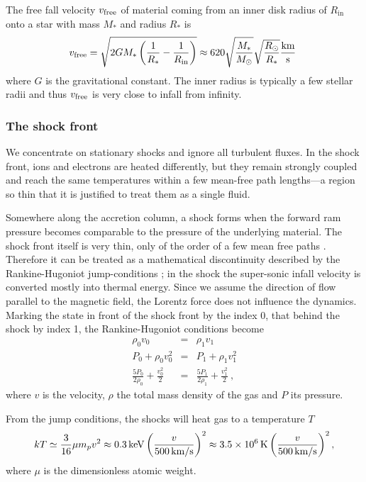 The free fall velocity $v_{\textnormal{free}}$ of material coming from an inner disk radius of $R_\mathrm{in}$ onto a star with mass $M_*$ and radius $R_*$ is
\begin{equation}
v_{\textnormal{free}} = \sqrt{{2GM_*} \left(\frac{1}{R_*} - \frac{1}{R_\mathrm{in}}\right)} \approx 620 \sqrt{\frac{M_*}{M_\odot}}\sqrt{\frac{R_\odot}{R_*}} \frac{\textnormal{km}}{\textnormal{s}}\ \label{eqn:freefall}
\end{equation}
where $G$ is the gravitational constant. The inner radius is typically a few stellar radii and thus $v_\textnormal{free}$ is very close to infall from infinity.


\subsubsection{The shock front}
We concentrate on stationary shocks and ignore all turbulent fluxes. In the shock front, ions and electrons are heated differently, but they remain strongly coupled and reach the same temperatures within a few mean-free path lengths---a region so thin that it is justified to treat them as a single fluid.

Somewhere along the accretion column, a shock forms when the forward ram pressure becomes comparable to the pressure of the underlying material. The shock front itself is very thin, only of the order of a few mean free paths \cite{raizerzeldovich}. Therefore it can be treated as a mathematical discontinuity described by the Rankine-Hugoniot jump-conditions \cite[][chap.~7, \S~15]{raizerzeldovich}; in the shock the super-sonic infall velocity is converted mostly into thermal energy. Since we assume the direction of flow parallel to the magnetic field, the Lorentz force does not influence the dynamics. Marking the state in front of the shock front by the index 0, that behind the shock by index 1, the Rankine-Hugoniot conditions become
\begin{eqnarray}
\rho_0 v_0 &=& \rho_1 v_1 \label{RH1}\\
P_0+\rho_0 v_0^2 &=& P_1+\rho_1 v_1^2 \label{RH2}\\
\frac{5 P_0}{2\rho_0}+\frac{v_0^2}{2}&=&\frac{5 P_1}{2\rho_1}+\frac{v_1^2}{2} \ ,\label{RH3}
\end{eqnarray}
where $v$ is the velocity, $\rho$ the total mass density of the gas and $P$ its pressure.

From the jump conditions, the shocks will heat gas to a temperature $T$
\begin{equation}
kT \simeq \frac{3}{16}\mu m_p v^{2} \approx 0.3\,{\rm keV}\left(\frac{v}{500\,{\rm km/s}}\right)^{2} \approx3.5\times10^6\,{\rm K} \left(\frac{v}{500\,{\rm km/s}}\right)^{2},
\label{eqn:Tshock}
\end{equation}
where $\mu$ is the dimensionless atomic weight.

